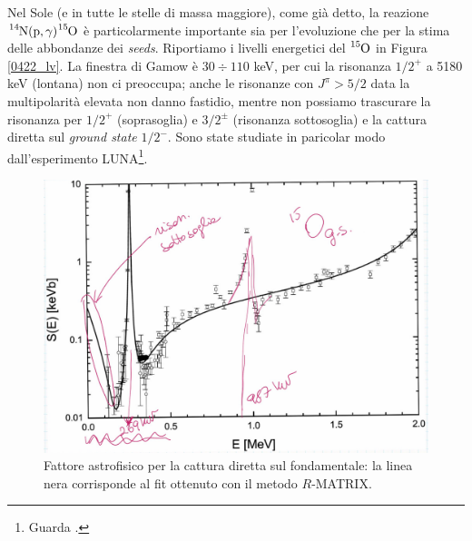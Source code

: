 \noindent Nel Sole (e in tutte le stelle di massa maggiore), come già detto, la reazione $\ce{^{14}N(p,\gamma)\ce{^{15}O}}$ è particolarmente importante sia per l'evoluzione che per la stima delle abbondanze dei \textit{seeds}. Riportiamo i livelli energetici del $\ce{^{15}O}$ in Figura \ref{0422_lv}. La finestra di Gamow è $30\div 110$ keV, per cui la risonanza $1/2^+$ a 5180 keV (lontana) non ci preoccupa; anche le risonanze con $J^\pi> 5/2$ data la multipolarità elevata non danno fastidio, mentre non possiamo trascurare la risonanza per $1/2^+$ (soprasoglia) e $3/2^\pm$ (risonanza sottosoglia) e la cattura diretta sul \textit{ground state} $1/2^-$. Sono state studiate in paricolar modo dall'esperimento LUNA\footnote{Guarda .}.

\begin{figure}[!h]
	\centering
	\includegraphics[scale=0.5]{Immagini/0422_0-Se.png}
	\caption{Fattore astrofisico per la cattura diretta sul fondamentale: la linea nera corrisponde al fit ottenuto con il metodo $R$-MATRIX.}
	\label{0422_cattura}
\end{figure}

